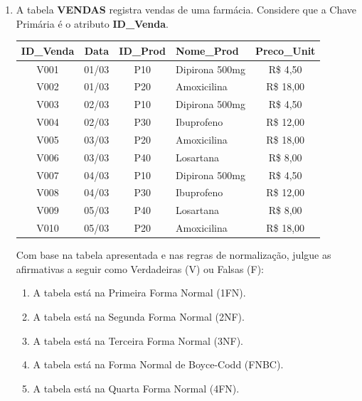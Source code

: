 \documentclass[12pt,a4paper]{article}
\newcommand{\resposta}[1]{
\noindent
\framebox[\textwidth]{
\begin{minipage}{0.98\textwidth}
\vspace{#1}
\end{minipage}
}
}
\begin{document}
\begin{enumerate}
\begin{enumerate}[label=(\Alph*)]
        \item Tabela normalizada:\\
        \resposta{6cm}
    \end{enumerate}


    \item A tabela \textbf{VENDAS} registra vendas de uma farmácia. Considere que a Chave Primária é o atributo \textbf{ID\_Venda}.

    \begin{center}
        \small
        \begin{tabular}{|c|c|c|l|c|}
            \hline
            \cellcolor{gray!20}\textbf{ID\_Venda} & \cellcolor{gray!20}\textbf{Data} & \cellcolor{gray!20}\textbf{ID\_Prod} & \cellcolor{gray!20}\textbf{Nome\_Prod} & \cellcolor{gray!20}\textbf{Preco\_Unit} \\ \hline
            V001 & 01/03 & P10 & Dipirona 500mg & R\$ 4,50 \\ \hline
            V002 & 01/03 & P20 & Amoxicilina & R\$ 18,00 \\ \hline
            V003 & 02/03 & P10 & Dipirona 500mg & R\$ 4,50 \\ \hline
            V004 & 02/03 & P30 & Ibuprofeno & R\$ 12,00 \\ \hline
            V005 & 03/03 & P20 & Amoxicilina & R\$ 18,00 \\ \hline
            V006 & 03/03 & P40 & Losartana & R\$ 8,00 \\ \hline
            V007 & 04/03 & P10 & Dipirona 500mg & R\$ 4,50 \\ \hline
            V008 & 04/03 & P30 & Ibuprofeno & R\$ 12,00 \\ \hline
            V009 & 05/03 & P40 & Losartana & R\$ 8,00 \\ \hline
            V010 & 05/03 & P20 & Amoxicilina & R\$ 18,00 \\ \hline
        \end{tabular}
    \end{center}

    Com base na tabela apresentada e nas regras de normalização, julgue as afirmativas a seguir como Verdadeiras (V) ou Falsas (F):

    \begin{enumerate}[label=( \quad )]
        \item A tabela está na Primeira Forma Normal (1FN).
        \item A tabela está na Segunda Forma Normal (2NF).
        \item A tabela está na Terceira Forma Normal (3NF).
        \item A tabela está na Forma Normal de Boyce-Codd (FNBC).
        \item A tabela está na Quarta Forma Normal (4FN).
    \end{enumerate}


\end{enumerate}
\end{document}
